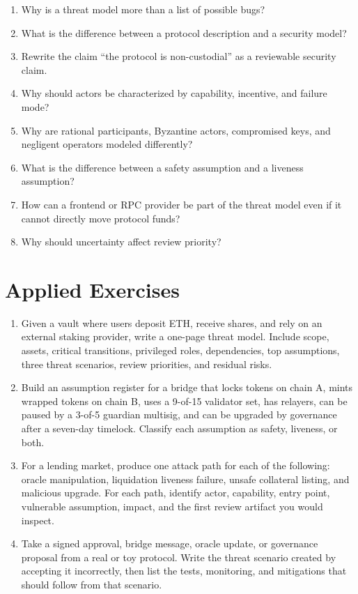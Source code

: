 \begin{enumerate}
\item Why is a threat model more than a list of possible bugs?
\item What is the difference between a protocol description and a security model?
\item Rewrite the claim ``the protocol is non-custodial'' as a reviewable security claim.
\item Why should actors be characterized by capability, incentive, and failure mode?
\item Why are rational participants, Byzantine actors, compromised keys, and negligent operators modeled differently?
\item What is the difference between a safety assumption and a liveness assumption?
\item How can a frontend or RPC provider be part of the threat model even if it cannot directly move protocol funds?
\item Why should uncertainty affect review priority?
\end{enumerate}

\section*{Applied Exercises}

\begin{enumerate}
\item Given a vault where users deposit ETH, receive shares, and rely on an external staking provider, write a one-page threat model. Include scope, assets, critical transitions, privileged roles, dependencies, top assumptions, three threat scenarios, review priorities, and residual risks.

\item Build an assumption register for a bridge that locks tokens on chain A, mints wrapped tokens on chain B, uses a 9-of-15 validator set, has relayers, can be paused by a 3-of-5 guardian multisig, and can be upgraded by governance after a seven-day timelock. Classify each assumption as safety, liveness, or both.

\item For a lending market, produce one attack path for each of the following: oracle manipulation, liquidation liveness failure, unsafe collateral listing, and malicious upgrade. For each path, identify actor, capability, entry point, vulnerable assumption, impact, and the first review artifact you would inspect.

\item Take a signed approval, bridge message, oracle update, or governance proposal from a real or toy protocol. Write the threat scenario created by accepting it incorrectly, then list the tests, monitoring, and mitigations that should follow from that scenario.
\end{enumerate}
